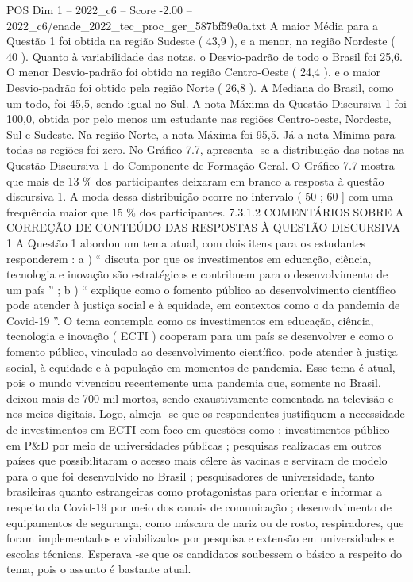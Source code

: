 \begin{textsample}{POS Dim 1 – 2022\_c6 – Score -2.00 – 2022\_c6/enade\_2022\_tec\_proc\_ger\_587bf59e0a.txt}
A maior Média para a Questão 1 foi obtida na região Sudeste ( 43,9 ), e a menor, na região Nordeste ( 40 ).
Quanto à variabilidade das notas, o Desvio-padrão de todo o Brasil foi 25,6.
O menor Desvio-padrão foi obtido na região Centro-Oeste ( 24,4 ), e o maior Desvio-padrão foi obtido pela região Norte ( 26,8 ).
A Mediana do Brasil, como um todo, foi 45,5, sendo igual no Sul.
A nota Máxima da Questão Discursiva 1 foi 100,0, obtida por pelo menos um estudante nas regiões Centro-oeste, Nordeste, Sul e Sudeste.
Na região Norte, a nota Máxima foi 95,5.
Já a nota Mínima para todas as regiões foi zero.
No Gráfico 7.7, apresenta -se a distribuição das notas na Questão Discursiva 1 do Componente de Formação Geral.
O Gráfico 7.7 mostra que mais de 13 \% dos participantes deixaram em branco a resposta à questão discursiva 1.
A moda dessa distribuição ocorre no intervalo ( 50 ; 60 ] com uma frequência maior que 15 \% dos participantes. 7.3.1.2 COMENTÁRIOS SOBRE A CORREÇÃO DE CONTEÚDO DAS RESPOSTAS À QUESTÃO DISCURSIVA 1 A Questão 1 abordou um tema atual, com dois itens para os estudantes responderem : a ) “ discuta por que os investimentos em educação, ciência, tecnologia e inovação são estratégicos e contribuem para o desenvolvimento de um país ” ; b ) “ explique como o fomento público ao desenvolvimento científico pode atender à justiça social e à equidade, em contextos como o da pandemia de Covid-19 ”.
O tema contempla como os investimentos em educação, ciência, tecnologia e inovação ( ECTI ) cooperam para um país se desenvolver e como o fomento público, vinculado ao desenvolvimento científico, pode atender à justiça social, à equidade e à população em momentos de pandemia.
Esse tema é atual, pois o mundo vivenciou recentemente uma pandemia que, somente no Brasil, deixou mais de 700 mil mortos, sendo exaustivamente comentada na televisão e nos meios digitais.
Logo, almeja -se que os respondentes justifiquem a necessidade de investimentos em ECTI com foco em questões como : investimentos público em P\&D por meio de universidades públicas ; pesquisas realizadas em outros países que possibilitaram o acesso mais célere às vacinas e serviram de modelo para o que foi desenvolvido no Brasil ; pesquisadores de universidade, tanto brasileiras quanto estrangeiras como protagonistas para orientar e informar a respeito da Covid-19 por meio dos canais de comunicação ; desenvolvimento de equipamentos de segurança, como máscara de nariz ou de rosto, respiradores, que foram implementados e viabilizados por pesquisa e extensão em universidades e escolas técnicas.
Esperava -se que os candidatos soubessem o básico a respeito do tema, pois o assunto é bastante atual.

\end{textsample}
